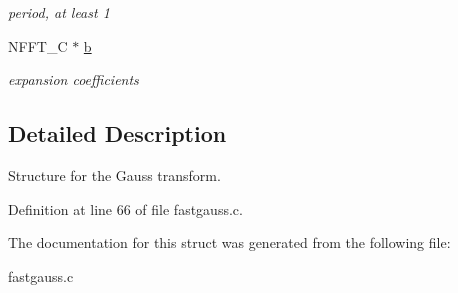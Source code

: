 \begin{DoxyCompactItemize}
\begin{DoxyCompactList}\small\item\em period, at least 1 \end{DoxyCompactList}\item 
\hypertarget{structfgt__plan_a93080f3620dfe80c06b0e1880de120ea}{N\-F\-F\-T\-\_\-\-C $\ast$ \hyperlink{structfgt__plan_a93080f3620dfe80c06b0e1880de120ea}{b}}\label{structfgt__plan_a93080f3620dfe80c06b0e1880de120ea}

\begin{DoxyCompactList}\small\item\em expansion coefficients \end{DoxyCompactList}\end{DoxyCompactItemize}


\subsection{Detailed Description}
Structure for the Gauss transform. 

Definition at line 66 of file fastgauss.\-c.



The documentation for this struct was generated from the following file\-:\begin{DoxyCompactItemize}
\item 
fastgauss.\-c\end{DoxyCompactItemize}
